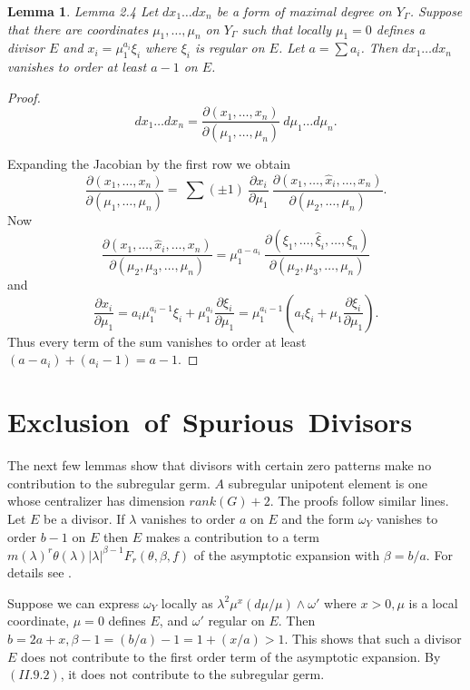 \documentclass{memo-l}
\newtheorem{lemma}[theorem]{Lemma}
\theoremstyle{definition}
\theoremstyle{remark}
\numberwithin{section}{chapter}
\numberwithin{equation}{chapter}
\begin{document}
{\medskip}

\begin{lemma}{Lemma 2.4}    Let $dx_{1}\ldots dx_{n}$ be a form of maximal degree on
$Y_{{\Gamma}}$.
 Suppose that there are coordinates ${\mu}_{1},\ldots ,{\mu}_{n}$ on
$Y_{{\Gamma}}$ such that locally ${\mu}_{1} = 0$ defines a divisor $E$ and
$x_{i} = {\mu}_{1}^{a_i} {\xi}_{i}$ where ${\xi}_{i}$ is regular on $E$.
 Let $a = \sum a_{i}$.
 Then $dx_{1}\ldots dx_{n}$ vanishes to order at least $a-1$ on $E$.
\end{lemma}

\medpagebreak

\begin{proof}
$$
dx_1\ldots dx_n = {\frac{\partial(x_1,\ldots, x_n)}{\partial (\mu_1,\ldots,
\mu_n)}}\  d{\mu}_{1}\ldots d{\mu}_{n}.
$$

\noindent
Expanding the Jacobian by the first row we obtain
$$
{\frac{\partial(x_1,\ldots,x_n)}{\partial(\mu_1,\ldots,\mu_n)}} =\
\sum (\pm 1)\ {\frac{\partial x_i}{\partial \mu_1}}\
{\frac{\partial(x_1,\ldots,\hat{x}_i,\ldots,x_n)}{\partial(\mu_2,\ldots,\mu_n)}}.
$$
Now
$$
{\frac{\partial(x_1,\ldots,\hat{x}_i,\ldots,x_n)}{\partial(\mu_2,\mu_3,\ldots,\mu_n)}} =
\mu_1^{a-a_i}\ {\frac{\partial(\xi_1,\ldots,\hat{\xi}_i,\ldots,\xi_n)}
{\partial(\mu_2,\mu_3,\ldots,\mu_n)}}
$$
and
$$
{\frac{\partial x_i}{\partial \mu_1}} = a_i\mu_1^{a_i-1} \xi_i +
\mu_1^{a_i} {\frac{\partial\xi_i}{\partial \mu_1}} =
\mu_1^{a_i-1} (a_i\xi_i+\mu_1 {\frac{\partial \xi_i}{\partial \mu_1}}).
$$
Thus every term of the sum vanishes to order at least $(a-a_{i}) + (a_{i}-1)
= a-1$.
\end{proof}

\section{Exclusion\ of\ Spurious\ Divisors}


   The next few lemmas show that divisors with certain zero patterns make
no contribution to the subregular germ.
 $A$ subregular unipotent element is one whose centralizer has dimension
$rank(G)+2$.
 The proofs follow similar lines.
 Let $E$ be a divisor.
 If ${\lambda}$ vanishes to order ${a}$ on $E$ and the form
${\omega}_{Y}$ vanishes to order ${b-1}$ on $E$ then $E$ makes a
contribution to a term $m({\lambda})^{r}{\theta}({\lambda})\vert
{\lambda}\vert ^{{\beta}-1}F_{r}({\theta},{\beta},f)$ of the asymptotic
expansion with ${\beta}=b/a$.
 For details see \cite{MR701566}.

 Suppose we can express ${\omega}_{Y}$ locally as ${\lambda}^{2}{\mu}^{x}
 (d{\mu}/{\mu}) \wedge {\omega}'$ where $x>0, {\mu}$ is a local coordinate,
${\mu}=0$ defines $E$, and ${\omega}'$ regular on $E$.
 Then $b=2a+x, {\beta}-1 = (b/a)-1 = 1 + (x/a) > 1$.
 This shows that such a divisor $E$ does not contribute to the first order
term of the asymptotic expansion.
 By $(II.9.2)$, it does not contribute to the subregular germ.
\end{document}
